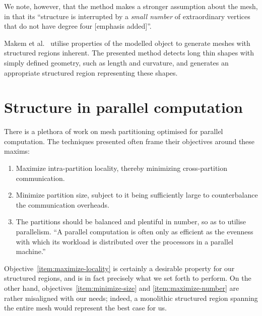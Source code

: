 We note, however, that the method makes a stronger assumption about the mesh, in that its ``structure is interrupted by a \emph{small number} of extraordinary vertices that do not have degree four [emphasis added]''.



Makem et al.~\cite{makem2012automatic} utilise properties of the modelled object to generate meshes with structured regions inherent. The presented method detects long thin shapes with simply defined geometry, such as length and curvature, and generates an appropriate structured region representing these shapes.



\section{Structure in parallel computation}
There is a plethora of work on mesh partitioning optimised for parallel computation. The techniques presented often frame their objectives around these maxims:
\begin{enumerate}
\item \label{item:maximize-locality} Maximize intra-partition locality, thereby minimizing cross-partition communication.
\item \label{item:minimize-size} Minimize partition size, subject to it being sufficiently large to counterbalance the communication overheads.
\item \label{item:maximize-number} The partitions should be balanced and plentiful in number, so as to utilise parallelism.
``A parallel computation is often only as efficient as the evenness with which its workload is distributed over the processors in a parallel machine.''
\end{enumerate}

Objective~\ref{item:maximize-locality} is certainly a desirable property for our structured regions, and is in fact precisely what we set forth to perform.
On the other hand, objectives~\ref{item:minimize-size} and \ref{item:maximize-number} are rather misaligned with our needs; indeed, a monolithic structured region spanning the entire mesh would represent the best case for us.

